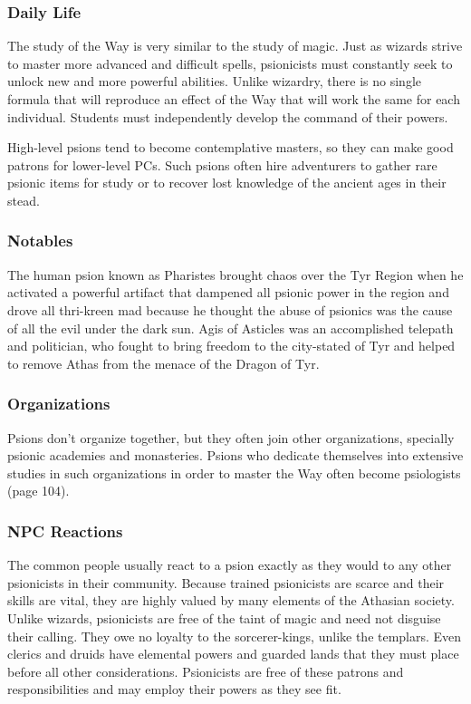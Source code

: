 \subsubsection{Daily Life}

The study of the Way is very similar to the study of magic. Just as wizards strive to master more advanced and difficult spells, psionicists must constantly seek to unlock new and more powerful abilities. Unlike wizardry, there is no single formula that will reproduce an effect of the Way that will work the same for each individual. Students must independently develop the command of their powers.

High-level psions tend to become contemplative masters, so they can make good patrons for lower-level PCs. Such psions often hire adventurers to gather rare psionic items for study or to recover lost knowledge of the ancient ages in their stead.

\subsubsection{Notables}

The human psion known as Pharistes brought chaos over the Tyr Region when he activated a powerful artifact that dampened all psionic power in the region and drove all thri-kreen mad because he thought the abuse of psionics was the cause of all the evil under the dark sun. Agis of Asticles was an accomplished telepath and politician, who fought to bring freedom to the city-stated of Tyr and helped to remove Athas from the menace of the Dragon of Tyr.

\subsubsection{Organizations}

Psions don't organize together, but they often join other organizations, specially psionic academies and monasteries. Psions who dedicate themselves into extensive studies in such organizations in order to master the Way often become psiologists (page 104).

\subsubsection{NPC Reactions}

The common people usually react to a psion exactly as they would to any other psionicists in their community. Because trained psionicists are scarce and their skills are vital, they are highly valued by many elements of the Athasian society. Unlike wizards, psionicists are free of the taint of magic and need not disguise their calling. They owe no loyalty to the sorcerer-kings, unlike the templars. Even clerics and druids have elemental powers and guarded lands that they must place before all other considerations. Psionicists are free of these patrons and responsibilities and may employ their powers as they see fit.

